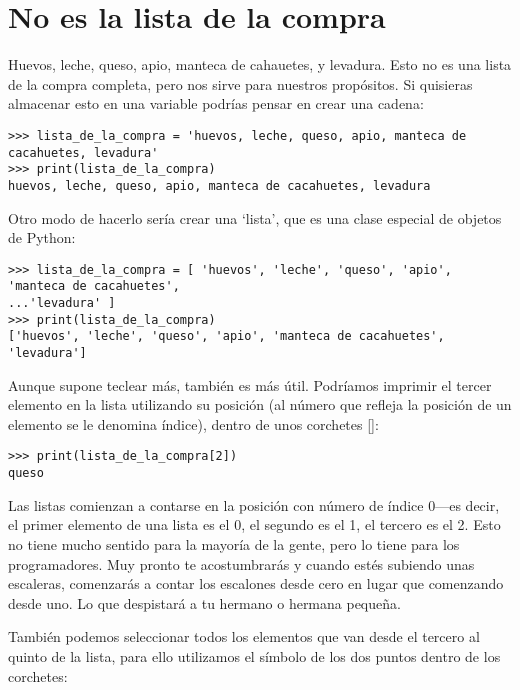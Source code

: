 \section{No es la lista de la compra}

Huevos, leche, queso, apio, manteca de cahauetes, y levadura. Esto no es una lista de la compra completa, pero nos sirve para nuestros propósitos. Si quisieras almacenar esto en una variable podrías pensar en crear una cadena:

\begin{listing}
\begin{verbatim}
>>> lista_de_la_compra = 'huevos, leche, queso, apio, manteca de cacahuetes, levadura'
>>> print(lista_de_la_compra)
huevos, leche, queso, apio, manteca de cacahuetes, levadura
\end{verbatim}
\end{listing}

Otro modo de hacerlo sería crear una `lista', que es una clase especial de objetos de Python:

\begin{listing}
\begin{verbatim}
>>> lista_de_la_compra = [ 'huevos', 'leche', 'queso', 'apio', 'manteca de cacahuetes',
...'levadura' ]
>>> print(lista_de_la_compra)
['huevos', 'leche', 'queso', 'apio', 'manteca de cacahuetes', 'levadura']
\end{verbatim}
\end{listing}

Aunque supone teclear más, también es más útil. Podríamos imprimir el tercer elemento en la lista utilizando su posición (al número que refleja la posición de un elemento se le denomina índice), dentro de unos corchetes []: 

\begin{listing}
\begin{verbatim}
>>> print(lista_de_la_compra[2])
queso
\end{verbatim}
\end{listing}

Las listas comienzan a contarse en la posición con número de índice 0---es decir, el primer elemento de una lista es el 0, el segundo es el 1, el tercero es el 2. Esto no tiene mucho sentido para la mayoría de la gente, pero lo tiene para los programadores. Muy pronto te acostumbrarás y cuando estés subiendo unas escaleras, comenzarás a contar los escalones desde cero en lugar que comenzando desde uno. Lo que despistará a tu hermano o hermana pequeña.
\par
También podemos seleccionar todos los elementos que van desde el tercero al quinto de la lista, para ello utilizamos el símbolo de los dos puntos dentro de los corchetes:

